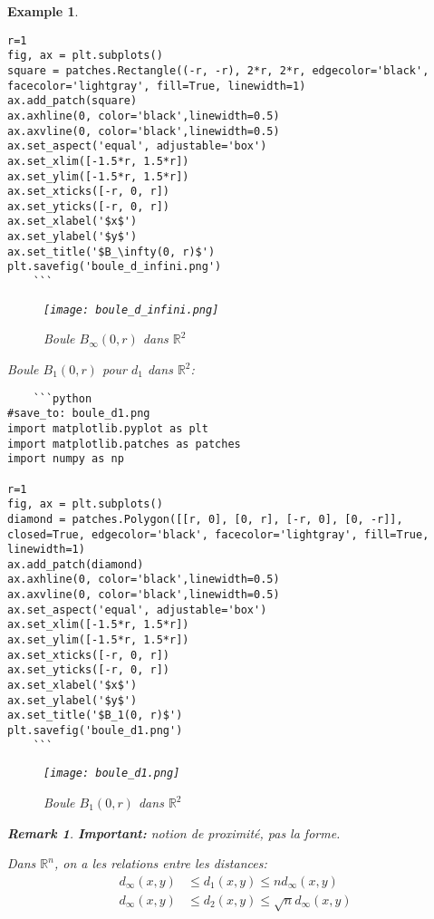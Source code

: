 \documentclass{article}
\newtheorem{remark}{Remark}
\newtheorem{example}{Example}
\begin{document}
\begin{example}
\begin{enumerate}
\begin{verbatim}
r=1
fig, ax = plt.subplots()
square = patches.Rectangle((-r, -r), 2*r, 2*r, edgecolor='black', facecolor='lightgray', fill=True, linewidth=1)
ax.add_patch(square)
ax.axhline(0, color='black',linewidth=0.5)
ax.axvline(0, color='black',linewidth=0.5)
ax.set_aspect('equal', adjustable='box')
ax.set_xlim([-1.5*r, 1.5*r])
ax.set_ylim([-1.5*r, 1.5*r])
ax.set_xticks([-r, 0, r])
ax.set_yticks([-r, 0, r])
ax.set_xlabel('$x$')
ax.set_ylabel('$y$')
ax.set_title('$B_\infty(0, r)$')
plt.savefig('boule_d_infini.png')
    ```
    \end{verbatim}

    \begin{figure}[H]
        \centering
        \texttt{[image: boule\_d\_infini.png]}
        \caption{Boule $B_\infty(0, r)$ dans $\mathbb{R}^2$}
        \label{fig:boule_d_infini}
    \end{figure}

        Boule $B_1(0, r)$ pour $d_1$ dans $\mathbb{R}^2$:

    \begin{verbatim}
    ```python
#save_to: boule_d1.png
import matplotlib.pyplot as plt
import matplotlib.patches as patches
import numpy as np

r=1
fig, ax = plt.subplots()
diamond = patches.Polygon([[r, 0], [0, r], [-r, 0], [0, -r]], closed=True, edgecolor='black', facecolor='lightgray', fill=True, linewidth=1)
ax.add_patch(diamond)
ax.axhline(0, color='black',linewidth=0.5)
ax.axvline(0, color='black',linewidth=0.5)
ax.set_aspect('equal', adjustable='box')
ax.set_xlim([-1.5*r, 1.5*r])
ax.set_ylim([-1.5*r, 1.5*r])
ax.set_xticks([-r, 0, r])
ax.set_yticks([-r, 0, r])
ax.set_xlabel('$x$')
ax.set_ylabel('$y$')
ax.set_title('$B_1(0, r)$')
plt.savefig('boule_d1.png')
    ```
    \end{verbatim}

    \begin{figure}[H]
        \centering
        \texttt{[image: boule\_d1.png]}
        \caption{Boule $B_1(0, r)$ dans $\mathbb{R}^2$}
        \label{fig:boule_d1}
    \end{figure}

    \begin{remark}
    \textbf{Important:} notion de proximité, pas la forme.
    \end{remark}

    Dans $\mathbb{R}^n$, on a les relations entre les distances:
    \begin{align*}
        d_\infty(x, y) &\leq d_1(x, y) \leq n d_\infty(x, y) \\
        d_\infty(x, y) &\leq d_2(x, y) \leq \sqrt{n} d_\infty(x, y)
    \end{align*}
\end{enumerate}
\end{example}
\end{document}
